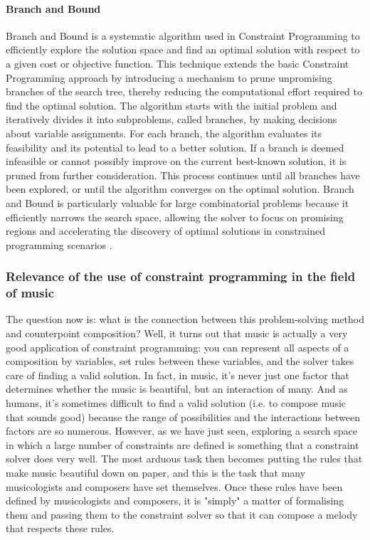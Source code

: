 \paragraph{Branch and Bound}
Branch and Bound is a systematic algorithm used in Constraint Programming to efficiently explore the solution space and find an optimal solution with respect to a given cost or objective function. This technique extends the basic Constraint Programming approach by introducing a mechanism to prune unpromising branches of the search tree, thereby reducing the computational effort required to find the optimal solution. The algorithm starts with the initial problem and iteratively divides it into subproblems, called branches, by making decisions about variable assignments. For each branch, the algorithm evaluates its feasibility and its potential to lead to a better solution. If a branch is deemed infeasible or cannot possibly improve on the current best-known solution, it is pruned from further consideration. This process continues until all branches have been explored, or until the algorithm converges on the optimal solution. Branch and Bound is particularly valuable for large combinatorial problems because it efficiently narrows the search space, allowing the solver to focus on promising regions and accelerating the discovery of optimal solutions in constrained programming scenarios \cite{morrison2016branch}. 

\subsubsection{Relevance of the use of constraint programming in the field of music}
The question now is: what is the connection between this problem-solving method and counterpoint composition? Well, it turns out that music is actually a very good application of constraint programming: you can represent all aspects of a composition by variables, set rules between these variables, and the solver takes care of finding a valid solution. In fact, in music, it's never just one factor that determines whether the music is beautiful, but an interaction of many. And as humans, it's sometimes difficult to find a valid solution (i.e. to compose music that sounds good) because the range of possibilities and the interactions between factors are so numerous.  However, as we have just seen, exploring a search space in which a large number of constraints are defined is something that a constraint solver does very well. The most arduous task then becomes putting the rules that make music beautiful down on paper, and this is the task that many musicologists and composers have set themselves. Once these rules have been defined by musicologists and composers, it is "simply" a matter of formalising them and passing them to the constraint solver so that it can compose a melody that respects these rules.

